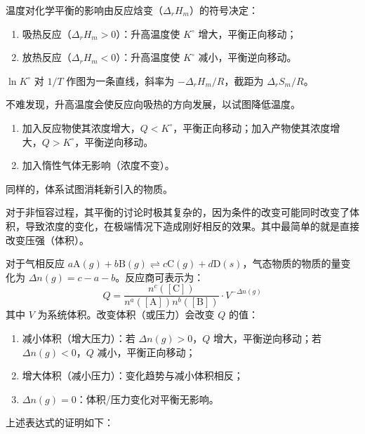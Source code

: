 \begin{proposition}[温度对平衡的影响]
温度对化学平衡的影响由反应焓变（$\Delta_r H_m$）的符号决定：
\begin{enumerate}
    \item 吸热反应（$\Delta_r H_m > 0$）：升高温度使 $K^\circ$ 增大，平衡正向移动；
    \item 放热反应（$\Delta_r H_m < 0$）：升高温度使 $K^\circ$ 减小，平衡逆向移动。
\end{enumerate}
$\ln K^\circ$ 对 $1/T$ 作图为一条直线，斜率为 $-\Delta_r H_m/R$，截距为 $\Delta_r S_m/R$。
\end{proposition}

不难发现，升高温度会使反应向吸热的方向发展，以试图降低温度。

\begin{proposition}[浓度和惰性气体对平衡的影响]
\begin{enumerate}
    \item 加入反应物使其浓度增大，$Q < K^\circ$，平衡正向移动；加入产物使其浓度增大，$Q > K^\circ$，平衡逆向移动。
    \item 加入惰性气体无影响（浓度不变）。
\end{enumerate}
\end{proposition}

同样的，体系试图消耗新引入的物质。

对于非恒容过程，其平衡的讨论时极其复杂的，因为条件的改变可能同时改变了体积，导致浓度的变化，在极端情况下造成刚好相反的效果。其中最简单的就是直接改变压强（体积）。

\begin{proposition}[体积和压力对平衡的影响]
对于气相反应 $a\text{A}(g) + b\text{B}(g) \rightleftharpoons c\text{C}(g) + d\text{D}(s)$，气态物质的物质的量变化为 $\Delta n(g) = c - a - b$。反应商可表示为：
$$Q = \frac{n^c([\text{C}])}{n^a([\text{A}])n^b([\text{B}])} \cdot V^{-\Delta n(g)}$$
其中 $V$ 为系统体积。改变体积（或压力）会改变 $Q$ 的值：
\begin{enumerate}
    \item 减小体积（增大压力）：若 $\Delta n(g) > 0$，$Q$ 增大，平衡逆向移动；若 $\Delta n(g) < 0$，$Q$ 减小，平衡正向移动；
    \item 增大体积（减小压力）：变化趋势与减小体积相反；
    \item $\Delta n(g) = 0$：体积/压力变化对平衡无影响。
\end{enumerate}
\end{proposition}

上述表达式的证明如下：

